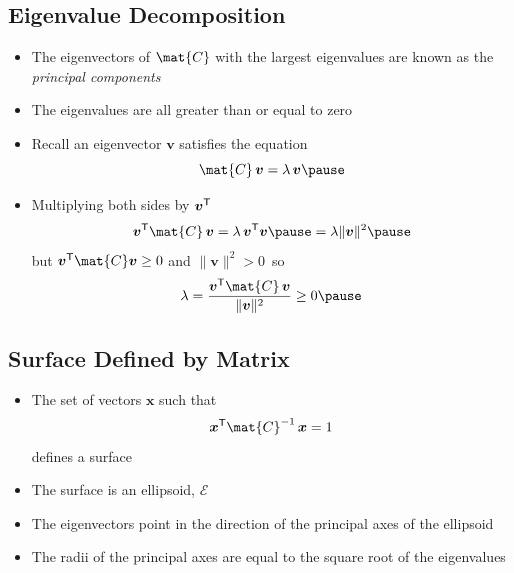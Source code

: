 
\begin{slide}
\section[-2]{Eigenvalue Decomposition}

\begin{PauseHighLight}

\begin{itemize}\squeeze
\item The eigenvectors of $\mat{C}$ with the largest eigenvalues are known
  as the \emph{principal components}\pause
\item The eigenvalues are all greater than or equal to zero\pause
\item Recall an eigenvector $\bm{v}$ satisfies the equation
  \begin{displaymath}
    \mat{C}\, \bm{v} = \lambda\, \bm{v}\pause
  \end{displaymath}
\item Multiplying both sides by $\bm{v}^{\textsf{T}}$\pause
  \begin{displaymath}
    \bm{v}^\tr \mat{C}\, \bm{v} = \lambda\, \bm{v}^\tr \bm{v}\pause
    = \lambda \|\bm{v}\|^2\pause
  \end{displaymath}
  but $\bm{v}^\tr \mat{C} \bm{v}\geq 0$ and $\|\bm{v}\|^2>0$\pause\ so
  \begin{displaymath}
    \lambda = \frac{\bm{v}^\tr \mat{C} \,\bm{v}}{\|\bm{v}\|^2} \geq 0\pause
  \end{displaymath}
\end{itemize}

\end{PauseHighLight}
\end{slide}


\begin{slide}
\section{Surface Defined by Matrix}

\begin{PauseHighLight}

\begin{itemize}
\item The set of vectors $\bm{x}$ such that
  \begin{displaymath}
    \bm{x}^\tr \mat{C}^{-1}\, \bm{x} = 1
  \end{displaymath}
defines a surface\pause
\item The surface is an ellipsoid, $\mathcal{E}$\pause
\item The eigenvectors point in the direction of the principal axes of the
  ellipsoid\pause
\item The radii of the principal axes are equal to the square root of
  the eigenvalues\pause
\end{itemize}


\end{PauseHighLight}
\end{slide}

